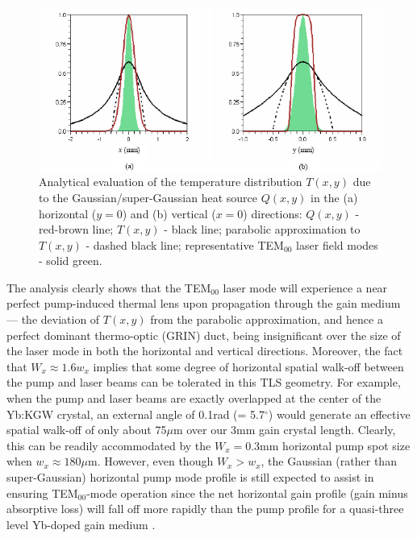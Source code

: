 \begin{figure}
  \centering
  \includegraphics{thermal.jpg}
  \caption{
    Analytical evaluation of the temperature distribution $T(x,y)$ due to the Gaussian/super-Gaussian heat source $Q(x,y)$ in the (a) horizontal ($y=0$) and (b) vertical ($x=0$) directions: $Q(x,y)$ - red-brown line; $T(x,y)$ - black line; parabolic approximation to $T(x,y)$ - dashed black line; representative TEM$_{00}$ laser field modes - solid green.
  }
  \label{fig:laser-thermal}
\end{figure}

The analysis clearly shows that the TEM$_{00}$ laser mode will experience a near perfect pump-induced thermal lens upon propagation through the gain medium --- the deviation of $T(x,y)$ from the parabolic approximation, and hence a perfect dominant thermo-optic (GRIN) duct, being insignificant over the size of the laser mode in both the horizontal and vertical directions.
Moreover, the fact that $W_x \approx 1.6 w_x$ implies that some degree of horizontal spatial walk-off between the pump and laser beams can be tolerated in this TLS geometry.
For example, when the pump and laser beams are exactly overlapped at the center of the Yb:KGW crystal, an external angle of 0.1rad (= 5.7$^\circ$) would generate an effective spatial walk-off of only about 75$\mu$m over our 3mm gain crystal length.
Clearly, this can be readily accommodated by the $W_x = 0.3$mm horizontal pump spot size when $w_x \approx 180\mu$m.
However, even though $W_x > w_x$, the Gaussian (rather than super-Gaussian) horizontal pump mode profile is still expected to assist in ensuring TEM$_{00}$-mode operation since the net horizontal gain profile (gain minus absorptive loss) will fall off more rapidly than the pump profile for a quasi-three level Yb-doped gain medium \cite{Brenier_new_criteria}.

